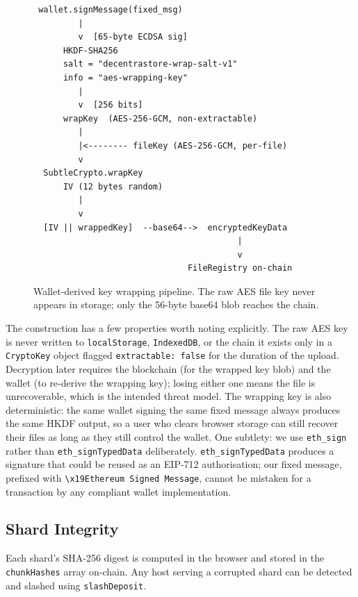 \documentclass[journal]{IEEEtran}
\begin{document}
\begin{figure}[t]
\centering
\begin{verbatim}
 wallet.signMessage(fixed_msg)
         |
         v  [65-byte ECDSA sig]
      HKDF-SHA256
      salt = "decentrastore-wrap-salt-v1"
      info = "aes-wrapping-key"
         |
         v  [256 bits]
      wrapKey  (AES-256-GCM, non-extractable)
         |
         |<-------- fileKey (AES-256-GCM, per-file)
         v
  SubtleCrypto.wrapKey
      IV (12 bytes random)
         |
         v
  [IV || wrappedKey]  --base64-->  encryptedKeyData
                                         |
                                         v
                               FileRegistry on-chain
\end{verbatim}
\caption{Wallet-derived key wrapping pipeline. The raw AES file key
never appears in storage; only the 56-byte base64 blob reaches the chain.}
\label{fig:keywrap}
\end{figure}

The construction has a few properties worth noting explicitly.
The raw AES key is never written to \texttt{localStorage}, \texttt{IndexedDB},
or the chain \textemdash{} it exists only in a \texttt{CryptoKey} object flagged
\texttt{extractable: false} for the duration of the upload.
Decryption later requires the blockchain (for the wrapped key blob) and
the wallet (to re-derive the wrapping key); losing either one means the
file is unrecoverable, which is the intended threat model.
The wrapping key is also deterministic: the same wallet signing the same
fixed message always produces the same HKDF output, so a user who clears
browser storage can still recover their files as long as they still
control the wallet.
One subtlety: we use \texttt{eth\_sign} rather than
\texttt{eth\_signTypedData} deliberately. \texttt{eth\_signTypedData}
produces a signature that could be reused as an EIP-712 authorisation;
our fixed message, prefixed with \texttt{\textbackslash x19Ethereum Signed Message},
cannot be mistaken for a transaction by any compliant wallet implementation.

\subsection{Shard Integrity}
Each shard's SHA-256 digest is computed in the browser and stored in the
\texttt{chunkHashes} array on-chain. Any host serving a corrupted shard
can be detected and slashed using \texttt{slashDeposit}.

\end{document}
